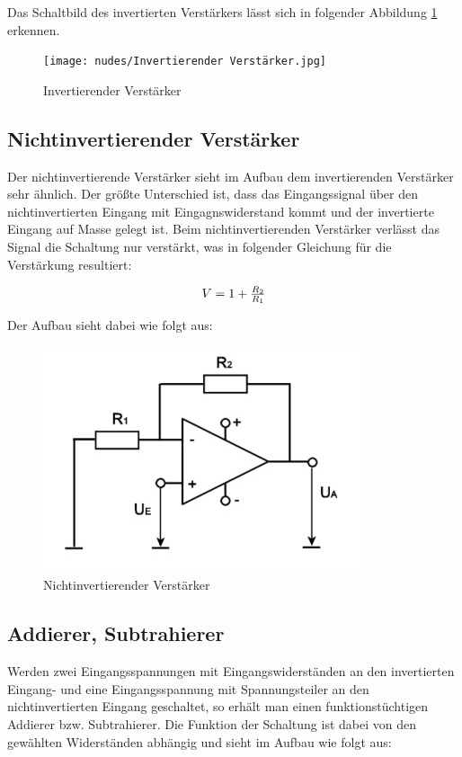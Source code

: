 \documentclass[12pt,a4paper,twoside]{article}
\begin{document}
\noindent
Das Schaltbild des invertierten Verstärkers lässt sich in folgender Abbildung \ref{fig:InvertierenderVerstärker} erkennen.

\begin{figure}[H]
    \centering
    \texttt{[image: nudes/Invertierender Verstärker.jpg]}
    \caption{Invertierender Verstärker \cite{teachcenter2}}
    \label{fig:InvertierenderVerstärker}
\end{figure}


\subsection{Nichtinvertierender Verstärker}

Der nichtinvertierende Verstärker sieht im Aufbau dem invertierenden Verstärker sehr ähnlich. Der größte Unterschied ist, dass das Eingangssignal über den nichtinvertierten Eingang mit Eingagnswiderstand kommt und der invertierte Eingang auf Masse gelegt ist.
Beim nichtinvertierenden Verstärker verlässt das Signal die Schaltung nur verstärkt, was in folgender Gleichung für die Verstärkung resultiert:

\begin{equation}
    \label{eq:NichtinvertierenderVerstärkerVerstärkung}
    \centerline{$V=1 + \frac{R_{2}}{R_{1}}$}
\end{equation}

\noindent
Der Aufbau sieht dabei wie folgt aus:

\begin{figure}[H]
    \centering
    \includegraphics[width=0.3\linewidth]{nudes/Nichtinvertierender Verstärker.jpg}
    \caption{Nichtinvertierender Verstärker \cite{teachcenter2}}
    \label{fig:NichtInvertierenderVerstärker}
\end{figure}


\subsection{Addierer, Subtrahierer}

Werden zwei Eingangsspannungen mit Eingangswiderständen an den invertierten Eingang- und eine Eingangsspannung mit Spannungsteiler an den nichtinvertierten Eingang geschaltet, so erhält man einen funktionstüchtigen Addierer bzw. Subtrahierer.
Die Funktion der Schaltung ist dabei von den gewählten Widerständen abhängig und sieht im Aufbau wie folgt aus:
\end{document}
